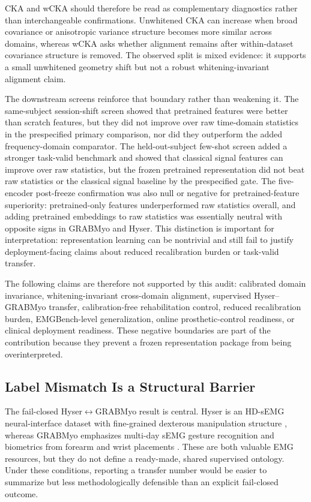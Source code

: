 \documentclass[journal]{IEEEtran}
\begin{document}
CKA and wCKA should therefore be read as complementary diagnostics rather than interchangeable confirmations. Unwhitened CKA can increase when broad covariance or anisotropic variance structure becomes more similar across domains, whereas wCKA asks whether alignment remains after within-dataset covariance structure is removed. The observed split is mixed evidence: it supports a small unwhitened geometry shift but not a robust whitening-invariant alignment claim.

The downstream screens reinforce that boundary rather than weakening it. The same-subject session-shift screen showed that pretrained features were better than scratch features, but they did not improve over raw time-domain statistics in the prespecified primary comparison, nor did they outperform the added frequency-domain comparator. The held-out-subject few-shot screen added a stronger task-valid benchmark and showed that classical signal features can improve over raw statistics, but the frozen pretrained representation did not beat raw statistics or the classical signal baseline by the prespecified gate. The five-encoder post-freeze confirmation was also null or negative for pretrained-feature superiority: pretrained-only features underperformed raw statistics overall, and adding pretrained embeddings to raw statistics was essentially neutral with opposite signs in GRABMyo and Hyser. This distinction is important for interpretation: representation learning can be nontrivial and still fail to justify deployment-facing claims about reduced recalibration burden or task-valid transfer.

The following claims are therefore not supported by this audit: calibrated domain invariance, whitening-invariant cross-domain alignment, supervised Hyser--GRABMyo transfer, calibration-free rehabilitation control, reduced recalibration burden, EMGBench-level generalization, online prosthetic-control readiness, or clinical deployment readiness. These negative boundaries are part of the contribution because they prevent a frozen representation package from being overinterpreted.

\subsection{Label Mismatch Is a Structural Barrier}
The fail-closed Hyser$\leftrightarrow$GRABMyo result is central. Hyser is an HD-sEMG neural-interface dataset with fine-grained dexterous manipulation structure \cite{jiang2021hyser}, whereas GRABMyo emphasizes multi-day sEMG gesture recognition and biometrics from forearm and wrist placements \cite{pradhan2022grabmyo}. These are both valuable EMG resources, but they do not define a ready-made, shared supervised ontology. Under these conditions, reporting a transfer number would be easier to summarize but less methodologically defensible than an explicit fail-closed outcome.
\end{document}
